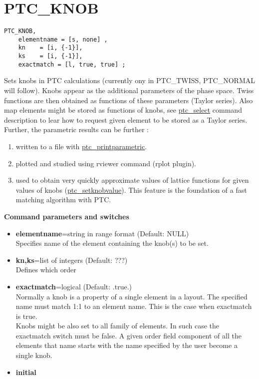 
\section{PTC\_KNOB}

\begin{verbatim}
PTC_KNOB, 
    elementname = [s, none] , 
    kn    = [i, {-1}], 
    ks    = [i, {-1}], 
    exactmatch = [l, true, true] ; 
\end{verbatim}

 Sets knobs in PTC calculations (currently ony in PTC\_TWISS,
 PTC\_NORMAL will follow). Knobs appear as the additional parameters of
 the phase space. Twiss functions are then obtained  as functions of
 these parameters (Taylor series).  Also map elements might be stored as
 functions of knobs, see  \href{PTC_Select.html}{ ptc\_select} command
 description to lear how to request given element to be stored as a
 Taylor series.  \\

Further, the parametric results can be further : 
\begin{enumerate}
   \item  written to a file with
     \href{PTC_PrintParametric.html}{ptc\_printparametric}. 
   \item  plotted and studied using rviewer command (rplot plugin). 
   \item  used to obtain very quickly approximate values of lattice
     functions for given values of knobs
     (\href{PTC_SetKnobValue.html}{ptc\_setknobvalue}). This
     feature is the foundation of a fast matching algorithm with
     PTC.      
\end{enumerate}


{\bf Command parameters and switches}
\begin{itemize}
   \item {\bf elementname}=string in range format (Default: NULL)\\
     Specifies name of the element containing the knob(s) to be set.   
   \item {\bf kn,ks}=list of integers (Default: ???)\\
     Defines which order    
   \item {\bf exactmatch}=logical (Default: .true.)\\
     Normally a knob is a property of a single element in a layout.
     The specified name must match 1:1 to an element name. This is the
     case when exactmatch is true.\\  
     Knobs might be also set to all family of elements. In such case
     the exactmatch switch must be false. A given order field
     component of all the elements that name starts with the
     name specified by the user become a single knob.
   \item {\bf initial}
\end{itemize}


